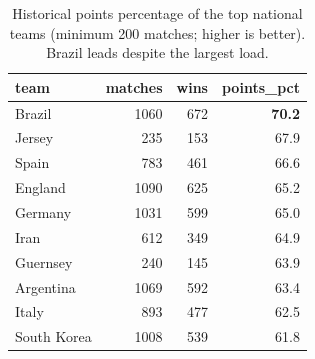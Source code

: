 \begin{table}[t]
  \centering
  \caption{Historical points percentage of the top national teams (minimum 200 matches; higher is better). Brazil leads despite the largest load.}
  \label{tab:winrate}
  \begin{tabular}{lrrr}
  \toprule
  team & matches & wins & points\_pct \\
  \midrule
  Brazil & 1060 & 672 & \textbf{70.2} \\
  Jersey & 235 & 153 & 67.9 \\
  Spain & 783 & 461 & 66.6 \\
  England & 1090 & 625 & 65.2 \\
  Germany & 1031 & 599 & 65.0 \\
  Iran & 612 & 349 & 64.9 \\
  Guernsey & 240 & 145 & 63.9 \\
  Argentina & 1069 & 592 & 63.4 \\
  Italy & 893 & 477 & 62.5 \\
  South Korea & 1008 & 539 & 61.8 \\
  \bottomrule
  \end{tabular}
\end{table}
